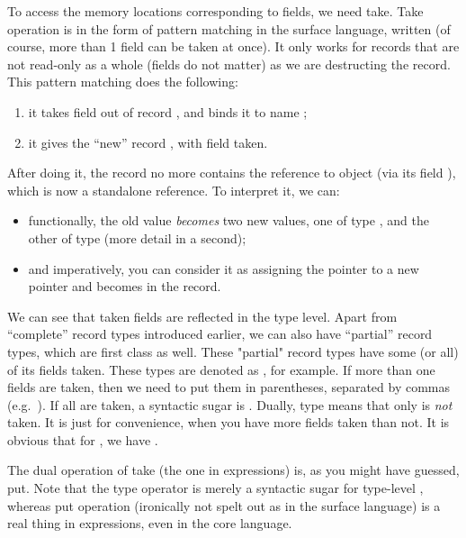 \documentclass[a4paper]{article}
\begin{document}
To access the memory locations corresponding to fields, we need take. Take operation is in the form of pattern matching in the
surface language, written  (of course, more than 1 field can be taken at once).
It only works for records that are not read-only as a whole (fields do not matter) as we are destructing the
record.
This pattern matching does the following:
\begin{enumerate}
\item it takes field  out of record , and binds it to name ;
\item it gives the ``new'' record , with field  taken.
\end{enumerate}
After doing it, the record  no more contains the reference to object  (via its field
), which is now a standalone reference.
To interpret it, we can:
\begin{itemize}
\item functionally, the old value  \emph{becomes} two new values, one of type , and the other of type
   (more detail in a second);
\item and imperatively, you can consider it as assigning the pointer to  a new pointer  and
 becomes  in the record.
\end{itemize}

We can see that taken fields are reflected in the type level. Apart from ``complete'' record types introduced earlier, we can also
have ``partial'' record types, which are first class as well. These "partial" record types have
some (or all) of its fields taken. These types are denoted as , for example. If more than one fields are taken, then we need to put them in parentheses,
separated by commas (e.g.\ ). If all are taken, a syntactic sugar is . Dually, type  means that only  is
\emph{not} taken. It is just for convenience, when you have more fields taken than not. It is obvious that for , we have
.

The dual operation of take (the one in expressions) is, as you might have guessed, put. Note that the type operator
 is merely a syntactic sugar for type-level ,
whereas put operation (ironically not spelt out as  in the
surface language) is a real thing in expressions, even in the core language.
\end{document}
